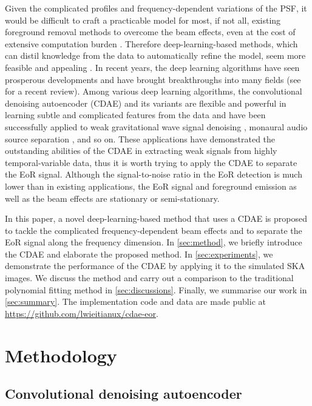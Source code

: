 \documentclass[fleqn,usenatbib]{mnras}
\begin{document}
Given the complicated profiles and frequency-dependent variations of
the PSF, it would be difficult to craft a practicable model for most,
if not all, existing foreground removal methods to overcome the beam
effects, even at the cost of extensive computation burden
\citep[e.g.,][]{lochner2015}.
Therefore deep-learning-based methods, which can distil knowledge from
the data to automatically refine the model, seem more feasible
and appealing \citep[e.g.,][]{herbel2018,vafaeiSadr2018}.
In recent years, the deep learning algorithms have seen prosperous
developments and have brought breakthroughs into many fields
(see \citealt{lecun2015} for a recent review).
Among various deep learning algorithms, the convolutional denoising
autoencoder (CDAE) and its variants are flexible and powerful in
learning subtle and complicated features from the data and have been
successfully applied to
weak gravitational wave signal denoising \citep[e.g.,][]{shen2017},
monaural audio source separation \citep[e.g.,][]{grais2017}, and so on.
These applications have demonstrated the outstanding abilities of the
CDAE in extracting weak signals from highly temporal-variable data,
thus it is worth trying to apply the CDAE to separate the EoR signal.
Although the signal-to-noise ratio in the EoR detection is much lower
than in existing applications, the EoR signal and foreground emission
as well as the beam effects are stationary or semi-stationary.

In this paper, a novel deep-learning-based method that uses a CDAE
is proposed to tackle the complicated frequency-dependent beam effects
and to separate the EoR signal along the frequency dimension.
In \autoref{sec:method}, we briefly introduce the CDAE and elaborate
the proposed method.
In \autoref{sec:experiments}, we demonstrate the performance of the
CDAE by applying it to the simulated SKA images.
We discuss the method and carry out a comparison to the traditional
polynomial fitting method in \autoref{sec:discussions}.
Finally, we summarise our work in \autoref{sec:summary}.
The implementation code and data are made public at
\url{https://github.com/lwieitianux/cdae-eor}.


\section{Methodology}
\label{sec:method}

\subsection{Convolutional denoising autoencoder}
\label{sec:cdae}
\end{document}
